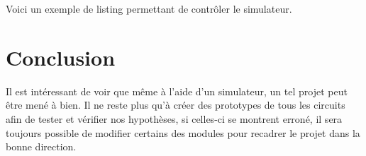 \documentclass[a4paper,oneside,11pt]{article}  %
\begin{document}
\newpage
Voici un exemple de listing permettant de contrôler le simulateur.



\section{Conclusion}

Il est intéressant de voir que même à l'aide d'un simulateur, un tel projet peut être mené à bien. Il ne reste plus qu'à créer des prototypes de tous les circuits afin de tester et vérifier nos hypothèses, si celles-ci se montrent erroné, il sera toujours possible de modifier certains des modules pour recadrer le projet dans la bonne direction.
\end{document}
